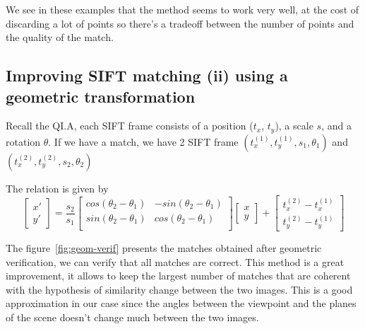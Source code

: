 \documentclass{article}
\begin{document}
We see in these examples that the method seems to work very well, at
the cost of discarding a lot of points so there's a tradeoff between
the number of points and the quality of the match.




\subsection{Improving SIFT matching (ii) using a geometric transformation}



Recall the QI.A, each SIFT frame consists of a position ($t_x$,
$t_y$), a scale $s$, and a rotation $\theta$. If we have a match, we
have 2 SIFT frame $(t^{(1)}_x, t^{(1)}_y, s_1, \theta_1)$ and
$(t^{(2)}_x, t^{(2)}_y, s_2, \theta_2)$

The relation is given by
\begin{equation*}
  \left[
  \begin{array}{l}
    x' \\
    y'
  \end{array}
  \right] =
  \dfrac{s_2}{s_1}
  \left[
  \begin{array}{lr}
    cos(\theta_2 - \theta_1) & -sin(\theta_2 - \theta_1) \\
    sin(\theta_2 - \theta_1) & cos(\theta_2 - \theta_1) \\
  \end{array}
  \right]
  \left[
  \begin{array}{l}
    x \\
    y
  \end{array}
  \right] +
  \left[
  \begin{array}{l}
    t^{(2)}_x - t^{(1)}_x \\
    t^{(2)}_y - t^{(1)}_y
  \end{array}
  \right]
\end{equation*}


The figure~\ref{fig:geom-verif} presents the matches obtained after
geometric verification, we can verify that all matches are correct.
This method is a great improvement, it allows to keep the largest
number of matches that are coherent with the hypothesis of similarity
change between the two images. This is a good approximation in our
case since the angles between the viewpoint and the planes of the
scene doesn't change much between the two images.
\end{document}

